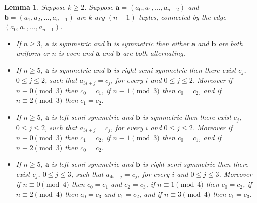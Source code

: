 \documentclass[10pt,a4paper]{amsart}
\newtheorem{lemma}{Lemma}
\begin{document}
\begin{lemma}  \label{lemma:constraint-interactions}
Suppose $k\geq2$.  Suppose $\mathbf{a}=(a_0,a_1,\dots,a_{n-2})$ and
$\mathbf{b}=(a_1,a_2,\dots,a_{n-1})$ are $k$-ary $(n-1)$-tuples, connected by the edge
$(a_0,a_1,\dots,a_{n-1})$.
\begin{itemize}
\item[i)] If $n\geq3$, $\mathbf{a}$ is symmetric and $\mathbf{b}$ is symmetric then either
    $\mathbf{a}$ and $\mathbf{b}$ are both uniform or $n$ is even and $\mathbf{a}$ and
    $\mathbf{b}$ are both alternating.
\item[ii)] If $n\geq5$, $\mathbf{a}$ is symmetric and $\mathbf{b}$ is right-semi-symmetric then
    there exist $c_j$, $0\leq j\leq2$, such that $a_{3i+j}=c_j$, for every $i$ and $0\leq j\leq
    2$.  Moreover if $n\equiv0\pmod3$ then $c_0=c_1$, if $n\equiv1\pmod3$ then $c_0=c_2$, and
    if $n\equiv2\pmod3$ then $c_1=c_2$.
\item[iii)] If $n\geq5$, $\mathbf{a}$ is left-semi-symmetric and $\mathbf{b}$ is symmetric then
    there exist $c_j$, $0\leq j\leq2$, such that $a_{3i+j}=c_j$, for every $i$ and $0\leq j\leq
    2$.  Moreover if $n\equiv0\pmod3$ then $c_1=c_2$, if $n\equiv1\pmod3$ then $c_0=c_1$, and
    if $n\equiv2\pmod3$ then $c_0=c_2$.
\item[iv)] If $n\geq5$, $\mathbf{a}$ is left-semi-symmetric and $\mathbf{b}$ is
    right-semi-symmetric then there exist $c_j$, $0\leq j\leq3$, such that $a_{4i+j}=c_j$, for
    every $i$ and $0\leq j\leq 3$. Moreover if $n\equiv0\pmod4$ then $c_0=c_1$ and $c_2=c_3$,
    if $n\equiv1\pmod4$ then $c_0=c_2$, if $n\equiv2\pmod4$ then $c_0=c_3$ and $c_1=c_2$, and
    if $n\equiv3\pmod4$ then $c_1=c_3$.
\end{itemize}
\end{lemma}
\end{document}
